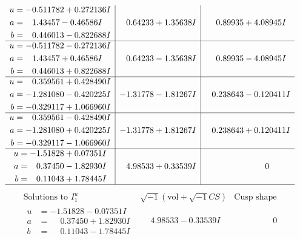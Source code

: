 \documentclass[1p]{elsarticle_modified}
\theoremstyle{definition}
\newcommand{\I}{\sqrt{-1}}
\begin{document}
$$\begin{array}{c|c|c}
\begin{aligned}
u &= -0.511782 + 0.272136 I \\
a &= \phantom{-}1.43457 - 0.46586 I \\
b &= \phantom{-}0.446013 - 0.822688 I\end{aligned}
 & \phantom{-}0.64233 + 1.35638 I & \phantom{-}0.89935 + 4.08945 I \\ \hline\begin{aligned}
u &= -0.511782 - 0.272136 I \\
a &= \phantom{-}1.43457 + 0.46586 I \\
b &= \phantom{-}0.446013 + 0.822688 I\end{aligned}
 & \phantom{-}0.64233 - 1.35638 I & \phantom{-}0.89935 - 4.08945 I \\ \hline\begin{aligned}
u &= \phantom{-}0.359561 + 0.428490 I \\
a &= -1.281080 - 0.420225 I \\
b &= -0.329117 + 1.066960 I\end{aligned}
 & -1.31778 - 1.81267 I & \phantom{-}0.238643 - 0.120411 I \\ \hline\begin{aligned}
u &= \phantom{-}0.359561 - 0.428490 I \\
a &= -1.281080 + 0.420225 I \\
b &= -0.329117 - 1.066960 I\end{aligned}
 & -1.31778 + 1.81267 I & \phantom{-}0.238643 + 0.120411 I \\ \hline\begin{aligned}
u &= -1.51828 + 0.07351 I \\
a &= \phantom{-}0.37450 - 1.82930 I \\
b &= \phantom{-}0.11043 + 1.78445 I\end{aligned}
 & \phantom{-}4.98533 + 0.33539 I & \phantom{-0.000000 } 0\\
 \hline 
 \end{array}$$\newpage$$\begin{array}{c|c|c}  
\text{Solutions to }I^u_{1}& \I (\text{vol} + \sqrt{-1}CS) & \text{Cusp shape}\\
 \hline 
\begin{aligned}
u &= -1.51828 - 0.07351 I \\
a &= \phantom{-}0.37450 + 1.82930 I \\
b &= \phantom{-}0.11043 - 1.78445 I\end{aligned}
 & \phantom{-}4.98533 - 0.33539 I & \phantom{-0.000000 } 0 \\ \hline\begin{aligned}

\end{aligned}
\end{array}$$
\end{document}

